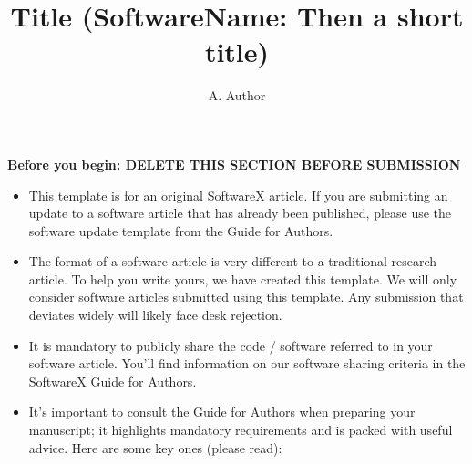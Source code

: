 \documentclass[preprint,12pt, a4paper]{elsarticle}
\begin{document}
\renewcommand{\labelenumii}{\arabic{enumi}.\arabic{enumii}}

\begin{frontmatter}



\title{Title (SoftwareName: Then a short title)}


\author{A. Author}

\address{Your institute, some address}

\textbf{Before you begin: DELETE THIS SECTION BEFORE SUBMISSION}\\

\begin{itemize}
	\item This template is for an original SoftwareX article. If you are submitting an update to a software article that has already been published, please use the software update template from the Guide for Authors.
    \item The format of a software article is very different to a traditional research article. To help you write yours, we have created this template. We will only consider software articles submitted using this template. Any submission that deviates widely will likely face desk rejection.
    \item It is mandatory to publicly share the code / software referred to in your software article. You’ll find information on our software sharing criteria in the SoftwareX Guide for Authors.  
    \item It’s important to consult the Guide for Authors when preparing your manuscript; it highlights mandatory requirements and is packed with useful advice. Here are some key ones (please read):


\end{itemize}
\end{frontmatter}
\end{document}
